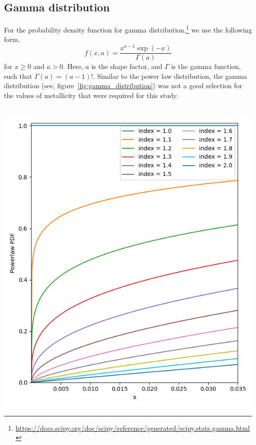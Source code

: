 \subsection{Gamma distribution}
\label{subsec:gamma-distribution}
For the probability density function for gamma distribution,\footnote{\url{https://docs.scipy.org/doc/scipy/reference/generated/scipy.stats.gamma.html}} we use the following form,
\begin{equation}
    f(x, a) = \frac{x^{a-1}\exp(-x)}{\Gamma(a)}
    \label{eq:gamma_distribution}
\end{equation}
for $x\geq 0$ and $a > 0$.
Here, $a$ is the shape factor, and $\Gamma$ is the gamma function, such that $\Gamma(a) = (a-1)!$.
Similar to the power law distribution, the gamma distribution (see, figure~\ref{fig:gamma_distribution}) was not a good selection for the values of metallicity that were required for this study.
\,\\\,\\
\begin{minipage}[l]{0.48\columnwidth}%
	\centering
    \includegraphics[width=\linewidth]{analysis_data/004__images_for_latex/powerlaw}
	\label{fig:pl_distribution}
\end{minipage}
